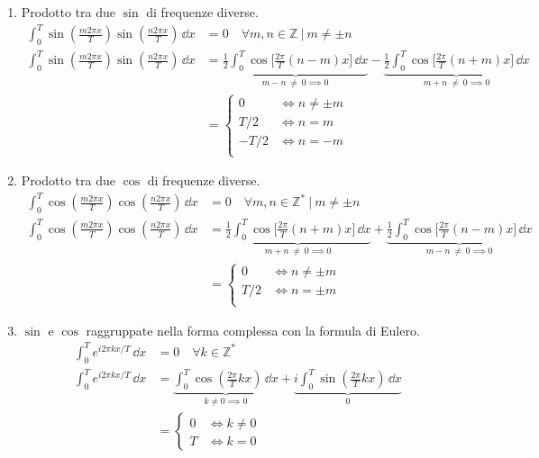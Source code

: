 \begin{enumerate}
\item {
    Prodotto tra due \(\sin\) di frequenze diverse.
    \begin{align*}
        \int_0^T \sin(\frac{m2\pi x}{T})\sin(\frac{n2\pi x}{T})\,\dd{x} &= 0 
        \quad \forall m,n \in \mathbb{Z}~|~m\neq \pm n \\
        \int_0^T \sin(\frac{m2\pi x}{T})\sin(\frac{n2\pi x}{T})\,\dd{x} &= 
        \underbrace{\frac{1}{2}\int_0^T\cos\bigg[\frac{2\pi}{T}(n-m)x\bigg]\,\dd{x}}_{m-n~\neq~0\implies 0} -
        \underbrace{\frac{1}{2}\int_0^T\cos\bigg[\frac{2\pi}{T}(n+m)x\bigg]\,\dd{x}}_{m+n~\neq~0\implies 0} \\
        &= \begin{cases}
            0 & \iff n \neq \pm m \\
            T/2 & \iff n = m \\
            - T/2 & \iff n = - m \\
        \end{cases}
    \end{align*}
}

\item {
    Prodotto tra due \(\cos\) di frequenze diverse.
    \begin{align*}
        \int_0^T \cos(\frac{m2\pi x}{T})\cos(\frac{n2\pi x}{T})\,\dd{x} &= 0 
        \quad \forall m,n \in \mathbb{Z}^*~|~m\neq \pm n \\
        \int_0^T \cos(\frac{m2\pi x}{T})\cos(\frac{n2\pi x}{T})\,\dd{x} &= 
        \underbrace{\frac{1}{2}\int_0^T\cos\bigg[\frac{2\pi}{T}(n+m)x\bigg]\,\dd{x}}_{m+n~\neq~0\implies 0} +
        \underbrace{\frac{1}{2}\int_0^T\cos\bigg[\frac{2\pi}{T}(n-m)x\bigg]\,\dd{x}}_{m-n~\neq~0\implies 0} \\
        &= \begin{cases}
            0 & \iff n \neq \pm m \\
            T/2 & \iff n = \pm m \\
        \end{cases}
    \end{align*}
}

\item {
    \(\sin\) e \(\cos\) raggruppate nella forma complessa con la formula di Eulero.
    \begin{align*}
        \int_0^T e^{i2\pi kx/T}\,\dd{x} &= 0
        \quad \forall k \in \mathbb{Z}^* \\
        \int_0^T e^{i2\pi kx/T}\,\dd{x} &=
        \underbrace{\int_0^T\cos(\frac{2\pi}{T} kx)\,\dd{x}}_{k\neq 0 \implies 0} + 
        \underbrace{i\int_0^T\sin(\frac{2\pi}{T} kx)\,\dd{x}}_{0}  \\
        &= \begin{cases}
            0 & \iff k \neq 0 \\
            T & \iff k = 0
        \end{cases}
    \end{align*}
}
\end{enumerate}

